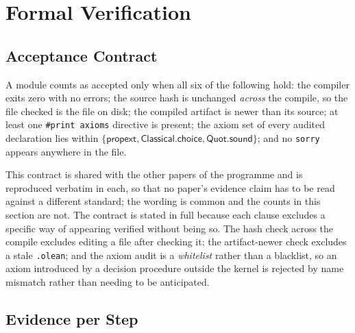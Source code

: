 \section{Formal Verification}
\label{sec:verification}

\subsection{Acceptance Contract}

A module counts as accepted only when all six of the following hold: the compiler exits zero
with no errors; the source hash is unchanged \emph{across} the compile, so the file checked is
the file on disk; the compiled artifact is newer than its source; at least one
\texttt{\#print axioms} directive is present; the axiom set of every audited declaration lies
within $\{\textsf{propext},\textsf{Classical.choice},\textsf{Quot.sound}\}$; and no
\texttt{sorry} appears anywhere in the file.

This contract is shared with the other papers of the programme and is reproduced verbatim in
each, so that no paper's evidence claim has to be read against a different standard; the
wording is common and the counts in this section are not. The contract is stated in full
because each clause excludes a specific way of appearing verified without being so. The hash check across the compile excludes editing a file after
checking it; the artifact-newer check excludes a stale \texttt{.olean}; and the axiom audit is
a \emph{whitelist} rather than a blacklist, so an axiom introduced by a decision procedure
outside the kernel is rejected by name mismatch rather than needing to be anticipated.

\subsection{Evidence per Step}

